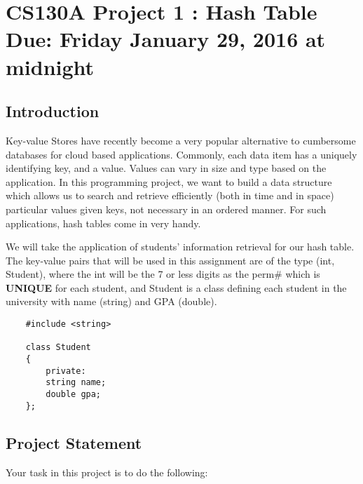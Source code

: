 \documentclass[times, 12pt]{article}
\begin{document}
\section*{CS130A Project 1 : Hash Table\\Due: Friday January 29, 2016 at midnight}

\subsection*{Introduction}
Key-value Stores have recently become a very popular alternative to cumbersome databases for
cloud based applications. Commonly, each data item has a uniquely identifying key, and a
value. Values can vary in size and type based on the application. In this programming
project, we want to build a data structure which allows us to search and retrieve efficiently (both in time and in space) particular values given keys, not necessary in an ordered manner. For such applications, hash tables come in very handy.

We will take the application of students' information retrieval for our hash table. The key-value pairs that will be used in this assignment are of the type (int, Student), where the int will be the 7 or less digits as the perm\# which is \textbf{UNIQUE} for each student, and Student is a class defining each student in the university with name (string) and GPA (double).

\begin{lstlisting}
    #include <string>
    
    class Student
    {
        private:
        string name;
        double gpa;
    };
\end{lstlisting}

\subsection*{Project Statement}
Your task in this project is to do the following:
\end{document}
